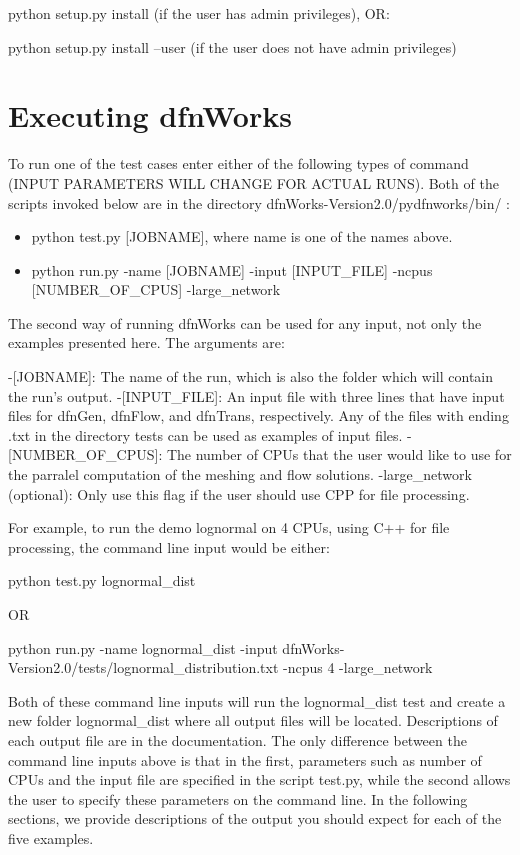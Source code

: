 \documentclass[letterpaper,10pt,english]{sphinxmanual}
\begin{document}
python setup.py install (if the user has admin privileges), OR:

python setup.py install --user (if the user does not have admin privileges)


\section{Executing dfnWorks}
\label{examples:executing-dfnworks}
To run one of the test cases enter either of the following types of command (INPUT PARAMETERS WILL CHANGE FOR ACTUAL RUNS). Both of the scripts invoked below are in the directory dfnWorks-Version2.0/pydfnworks/bin/ :
\begin{itemize}
\item {} 
python test.py {[}JOBNAME{]}, where name is one of the names above.

\item {} 
python run.py -name {[}JOBNAME{]} -input {[}INPUT\_FILE{]} -ncpus {[}NUMBER\_OF\_CPUS{]} -large\_network

\end{itemize}

The second way of running dfnWorks can be used for any input, not only the examples presented here. The arguments are:

-{[}JOBNAME{]}: The name of the run, which is also the folder which will contain the run's output.
-{[}INPUT\_FILE{]}: An input file with three lines that have input files for dfnGen, dfnFlow, and dfnTrans, respectively. Any of the files with ending .txt in the directory tests can be used as examples of input files.
-{[}NUMBER\_OF\_CPUS{]}: The number of CPUs that the user would like to use for the parralel computation of the meshing and flow solutions.
-large\_network (optional): Only use this flag if the user should use CPP for file processing.

For example, to run the demo lognormal on 4 CPUs, using C++ for file processing,  the command line input would be either:

python test.py lognormal\_dist

OR

python run.py -name lognormal\_dist -input dfnWorks-Version2.0/tests/lognormal\_distribution.txt -ncpus 4 -large\_network

Both of these command line inputs will run the lognormal\_dist test and create a new folder lognormal\_dist where all output files will be located. Descriptions of each output file are in the documentation. The only difference between the command line inputs above is that in the first, parameters such as number of CPUs and the input file are specified in the script test.py, while the second allows the user to specify these parameters on the command line. In the following sections, we provide descriptions of the output you should expect for each of the five examples.
\end{document}
